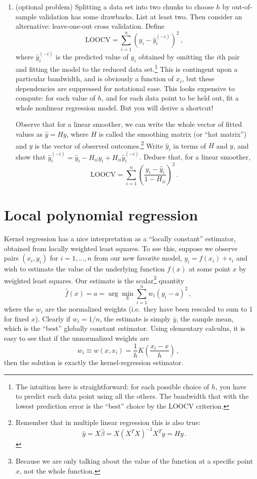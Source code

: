 \documentclass{homework}
\newcommand{\1}{\mathbf{1}}
\begin{document}
\begin{enumerate}[label=(\Alph*)]
\item (optional problem) Splitting a data set into two chunks to choose $h$ by out-of-sample validation has some drawbacks.  List at least two.  Then consider an alternative: leave-one-out cross validation.  Define
$$
\mbox{LOOCV} = \sum_{i=1}^n \left( y_i - \hat{y}_{i}^{(-i)} \right)^2 \, ,
$$
where $\hat{y}_{i}^{(-i)} $ is the predicted value of $y_i$ obtained by omitting the $i$th pair and fitting the model to the reduced data set.\footnote{The intuition here is straightforward: for each possible choice of $h$, you have to predict each data point using all the others.  The bandwidth that with the lowest prediction error is the ``best'' choice by the LOOCV criterion.}  This is contingent upon a particular bandwidth, and is obviously a function of $x_i$, but these dependencies are suppressed for notational ease.  This looks expensive to compute: for each value of $h$, and for each data point to be held out, fit a whole nonlinear regression model.  But you will derive a shortcut!

Observe that for a linear smoother, we can write the whole vector of fitted values as $\hat{y} = H y$, where $H$ is called the smoothing matrix (or ``hat matrix'') and $y$ is the vector of observed outcomes.\footnote{Remember that in multiple linear regression this is also true: $$\hat{y} = X \hat{\beta} = X (X^T X)^{-1} X^T y = Hy \, .$$}  Write $\hat{y}_i$ in terms of $H$ and $y$, and show that $\hat{y}_i^{(-i)} = \hat{y}_i - H_{ii} y_i + H_{ii} \hat{y}_i^{(-i)}$.  Deduce that, for a linear smoother,
$$
\mbox{LOOCV} = \sum_{i=1}^n \left( \frac{  y_i - \hat{y}_{i} } {1-H_{ii}} \right)^2 \, .
$$


\end{enumerate}



\section{Local polynomial regression}

Kernel regression has a nice interpretation as a ``locally constant'' estimator, obtained from locally weighted least squares.  To see this, suppose we observe pairs $(x_i, y_i)$ for $i = 1, \ldots, n$ from our new favorite model, $y_i = f(x_i) + \epsilon_i$ and wish to estimate the value of the underlying function $f(x)$ at some point $x$ by weighted least squares.  Our estimate is the scalar\footnote{Because we are only talking about the value of the function at a specific point $x$, not the whole function.} quantity
$$
\hat{f}(x) = a = \arg \min_{\mathbb{R}} \sum_{i=1}^n w_i (y_i - a)^2 \, ,
$$
where the $w_i$ are the normalized weights (i.e.~they have been rescaled to sum to 1 for fixed $x$).  Clearly if $w_i = 1/n$, the estimate is simply $\bar{y}$, the sample mean, which is the ``best'' globally constant estimator.  Using elementary calculus, it is easy to see that if the unnormalized weights are
$$
w_i \equiv w(x, x_i) = \frac{1}{h} K \left( \frac{x_i - x}{h} \right)  \, ,
$$
then the solution is exactly the kernel-regression estimator.
\end{document}

